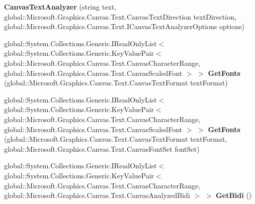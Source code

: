 \begin{DoxyCompactItemize}
\item 
\mbox{\label{class_microsoft_1_1_graphics_1_1_canvas_1_1_text_1_1_canvas_text_analyzer_a172420a2c7819041ea02464efb76d339}} 
{\bfseries Canvas\+Text\+Analyzer} (string text, global\+::\+Microsoft.\+Graphics.\+Canvas.\+Text.\+Canvas\+Text\+Direction text\+Direction, global\+::\+Microsoft.\+Graphics.\+Canvas.\+Text.\+I\+Canvas\+Text\+Analyzer\+Options options)
\item 
\mbox{\label{class_microsoft_1_1_graphics_1_1_canvas_1_1_text_1_1_canvas_text_analyzer_ac1c293067524638962722883284c69ca}} 
global\+::\+System.\+Collections.\+Generic.\+I\+Read\+Only\+List$<$ global\+::\+System.\+Collections.\+Generic.\+Key\+Value\+Pair$<$ global\+::\+Microsoft.\+Graphics.\+Canvas.\+Text.\+Canvas\+Character\+Range, global\+::\+Microsoft.\+Graphics.\+Canvas.\+Text.\+Canvas\+Scaled\+Font $>$ $>$ {\bfseries Get\+Fonts} (global\+::\+Microsoft.\+Graphics.\+Canvas.\+Text.\+Canvas\+Text\+Format text\+Format)
\item 
\mbox{\label{class_microsoft_1_1_graphics_1_1_canvas_1_1_text_1_1_canvas_text_analyzer_a9391eb6d25fdcd24794b19ace3079abb}} 
global\+::\+System.\+Collections.\+Generic.\+I\+Read\+Only\+List$<$ global\+::\+System.\+Collections.\+Generic.\+Key\+Value\+Pair$<$ global\+::\+Microsoft.\+Graphics.\+Canvas.\+Text.\+Canvas\+Character\+Range, global\+::\+Microsoft.\+Graphics.\+Canvas.\+Text.\+Canvas\+Scaled\+Font $>$ $>$ {\bfseries Get\+Fonts} (global\+::\+Microsoft.\+Graphics.\+Canvas.\+Text.\+Canvas\+Text\+Format text\+Format, global\+::\+Microsoft.\+Graphics.\+Canvas.\+Text.\+Canvas\+Font\+Set font\+Set)
\item 
\mbox{\label{class_microsoft_1_1_graphics_1_1_canvas_1_1_text_1_1_canvas_text_analyzer_a126fa8fa30a35ccb5f02bfc0b7f3555a}} 
global\+::\+System.\+Collections.\+Generic.\+I\+Read\+Only\+List$<$ global\+::\+System.\+Collections.\+Generic.\+Key\+Value\+Pair$<$ global\+::\+Microsoft.\+Graphics.\+Canvas.\+Text.\+Canvas\+Character\+Range, global\+::\+Microsoft.\+Graphics.\+Canvas.\+Text.\+Canvas\+Analyzed\+Bidi $>$ $>$ {\bfseries Get\+Bidi} ()

\end{DoxyCompactItemize}
